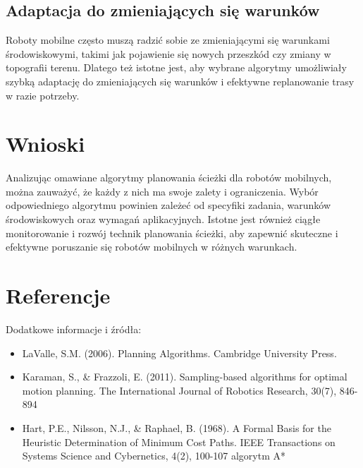 \documentclass[10pt,a4paper]{article}
\begin{document}
\subsection{Adaptacja do zmieniających się warunków}
Roboty mobilne często muszą radzić sobie ze zmieniającymi się warunkami środowiskowymi, takimi jak pojawienie się nowych przeszkód czy zmiany w topografii terenu. Dlatego też istotne jest, aby wybrane algorytmy umożliwiały szybką adaptację do zmieniających się warunków i efektywne replanowanie trasy w razie potrzeby.

\section{Wnioski}
Analizując omawiane algorytmy planowania ścieżki dla robotów mobilnych, można zauważyć, że każdy z nich ma swoje zalety i ograniczenia. Wybór odpowiedniego algorytmu powinien zależeć od specyfiki zadania, warunków środowiskowych oraz wymagań aplikacyjnych. Istotne jest również ciągłe monitorowanie i rozwój technik planowania ścieżki, aby zapewnić skuteczne i efektywne poruszanie się robotów mobilnych w różnych warunkach.

\section{Referencje}
Dodatkowe informacje i źródła:
\begin{itemize}
    \item LaValle, S.M. (2006). Planning Algorithms. Cambridge University Press.
    \item Karaman, S., \& Frazzoli, E. (2011). Sampling-based algorithms for optimal motion planning. The International Journal of Robotics Research, 30(7), 846-894
    \item Hart, P.E., Nilsson, N.J., \& Raphael, B. (1968). A Formal Basis for the Heuristic Determination of Minimum Cost Paths. IEEE Transactions on Systems Science and Cybernetics, 4(2), 100-107  algorytm A*
\end{itemize}
\end{document}

